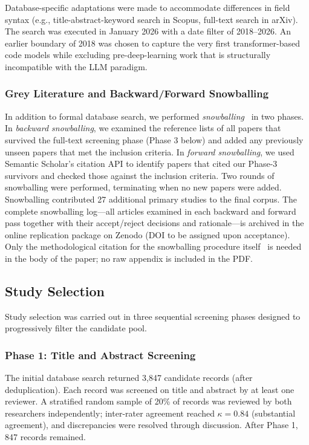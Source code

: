 Database-specific adaptations were made to accommodate differences in field syntax (e.g.,
title-abstract-keyword search in Scopus, full-text search in arXiv). The search was executed
in January 2026 with a date filter of 2018--2026. An earlier boundary of 2018 was chosen to
capture the very first transformer-based code models while excluding pre-deep-learning work
that is structurally incompatible with the LLM paradigm.

\subsubsection{Grey Literature and Backward/Forward Snowballing}

In addition to formal database search, we performed \emph{snowballing}~\cite{wohlin2014snowballing}
in two phases. In \emph{backward snowballing}, we examined the reference lists of all papers
that survived the full-text screening phase (Phase 3 below) and added any previously unseen
papers that met the inclusion criteria. In \emph{forward snowballing}, we used Semantic Scholar's
citation API to identify papers that cited our Phase-3 survivors and checked those against the
inclusion criteria. Two rounds of snowballing were performed, terminating when no new papers
were added. Snowballing contributed 27 additional primary studies to the final corpus.
The complete snowballing log---all articles examined in each backward and forward pass together
with their accept/reject decisions and rationale---is archived in the online replication
package on Zenodo (DOI to be assigned upon acceptance). Only the methodological citation for
the snowballing procedure itself~\cite{wohlin2014snowballing} is needed in the body of the
paper; no raw appendix is included in the PDF.

\subsection{Study Selection}
\label{subsec:selection}

Study selection was carried out in three sequential screening phases designed to progressively
filter the candidate pool.

\subsubsection{Phase 1: Title and Abstract Screening}

The initial database search returned 3,847 candidate records (after deduplication). Each record
was screened on title and abstract by at least one reviewer. A stratified random sample of 20\%
of records was reviewed by both researchers independently; inter-rater agreement reached
$\kappa = 0.84$ (substantial agreement), and discrepancies were resolved through discussion.
After Phase 1, 847 records remained.

